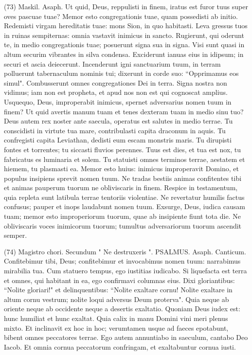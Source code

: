 \begin{biblechapter}  (73) 
\verse  Maskil. Asaph. Ut quid, Deus, reppulisti in finem, iratus est furor tuus super oves pascuae tuae? 
\verse Memor esto congregationis tuae, quam possedisti ab initio. Redemisti virgam hereditatis tuae: mons Sion, in quo habitasti. 
\verse Leva gressus tuos in ruinas sempiternas: omnia vastavit inimicus in sancto. 
\verse Rugierunt, qui oderunt te, in medio congregationis tuae; posuerunt signa sua in signa. 
\verse Visi sunt quasi in altum securim vibrantes in silva condensa. 
\verse Exciderunt ianuas eius in idipsum; in securi et ascia deiecerunt. 
\verse Incenderunt igni sanctuarium tuum, in terram polluerunt tabernaculum nominis tui; 
\verse dixerunt in corde suo: “Opprimamus eos simul". Combusserunt omnes congregationes Dei in terra. 
\verse Signa nostra non vidimus; iam non est propheta, et apud nos non est qui cognoscat amplius. 
\verse Usquequo, Deus, improperabit inimicus, spernet adversarius nomen tuum in finem? 
\verse Ut quid avertis manum tuam et tenes dexteram tuam in medio sinu tuo? 
\verse Deus autem rex noster ante saecula, operatus est salutes in medio terrae. 
\verse Tu conscidisti in virtute tua mare, contribulasti capita draconum in aquis. 
\verse Tu confregisti capita Leviathan, dedisti eum escam monstris maris. 
\verse Tu dirupisti fontes et torrentes; tu siccasti fluvios perennes. 
\verse Tuus est dies, et tua est nox, tu fabricatus es luminaria et solem. 
\verse Tu statuisti omnes terminos terrae, aestatem et hiemem, tu plasmasti ea. 
\verse Memor esto huius: inimicus improperavit Domino, et populus insipiens sprevit nomen tuum. 
\verse Ne tradas bestiis animas confitentes tibi et animas pauperum tuorum ne obliviscaris in finem. 
\verse Respice in testamentum, quia repleta sunt latibula terrae tentoriis violentiae. 
\verse Ne revertatur humilis factus confusus; pauper et inops laudabunt nomen tuum. 
\verse Exsurge, Deus, iudica causam tuam; memor esto improperiorum tuorum, quae ab insipiente fiunt tota die. 
\verse Ne obliviscaris voces inimicorum tuorum; tumultus adversariorum tuorum ascendit semper. 
\end{biblechapter}

\begin{biblechapter}  (74) 
\verse  Magistro chori. Secundum " Ne destruxeris ". PSALMUS. Asaph. Canticum. 
\verse Confitebimur tibi, Deus; confitebimur et invocabimus nomen tuum: narrabimus mirabilia tua. 
\verse Cum statuero tempus, ego iustitias iudicabo. 
\verse Si liquefacta est terra et omnes, qui habitant in ea, ego confirmavi columnas eius. 
\verse Dixi gloriantibus: “Nolite gloriari!" et delinquentibus: “Nolite exaltare cornu! 
\verse Nolite exaltare in altum cornu vestrum; nolite loqui adversus Deum proterva". 
\verse Quia neque ab oriente neque ab occidente neque a desertis exaltatio. 
\verse Quoniam Deus iudex est: hunc humiliat et hunc exaltat. 
\verse Quia calix in manu Domini vini meri plenus mixto. Et inclinavit ex hoc in hoc; verumtamen usque ad faeces epotabunt, bibent omnes peccatores terrae. 
\verse Ego autem annuntiabo in saeculum, cantabo Deo Iacob. 
\verse Et omnia cornua peccatorum confringam, et exaltabuntur cornua iusti. 
\end{biblechapter}

